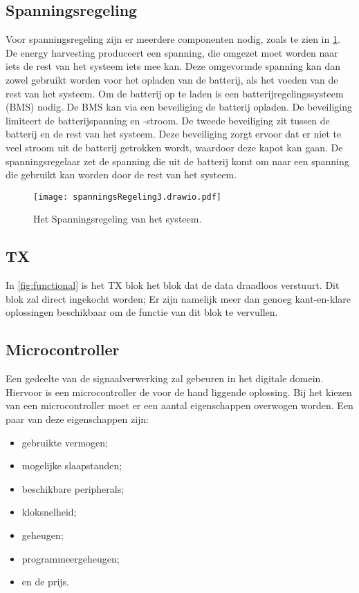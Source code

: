 \subsection{Spanningsregeling}
Voor spanningsregeling zijn er meerdere componenten nodig, zoals te zien in \cref{fig:spanningsregeling}. De energy harvesting produceert een spanning, die omgezet moet worden naar iets de rest van het systeem iets mee kan. Deze omgevormde spanning kan dan zowel gebruikt worden voor het opladen van de batterij, als het voeden van de rest van het systeem.
Om de batterij op te laden is een batterijregelingssysteem (BMS) nodig. De BMS kan via een beveiliging de batterij opladen. De beveiliging limiteert de batterijspanning en -stroom. De tweede beveiliging zit tussen de batterij en de rest van het systeem. Deze beveiliging zorgt ervoor dat er niet te veel stroom uit de batterij getrokken wordt, waardoor deze kapot kan gaan. De spanningsregelaar zet de spanning die uit de batterij komt om naar een spanning die gebruikt kan worden door de rest van het systeem.

\begin{figure}[!htbp]
    \centering
    \texttt{[image: spanningsRegeling3.drawio.pdf]}
    \caption{Het Spanningsregeling van het systeem.}
    \label{fig:spanningsregeling}
\end{figure}

\subsection{TX}
In \cref{fig:functional} is het TX blok het blok dat de data draadloos verstuurt. Dit blok zal direct ingekocht worden; Er zijn namelijk meer dan genoeg kant-en-klare oplossingen beschikbaar om de functie van dit blok te vervullen.


\subsection{Microcontroller}
Een gedeelte van de signaalverwerking zal gebeuren in het digitale domein. Hiervoor is een microcontroller de voor de hand liggende oplossing. Bij het kiezen van een microcontroller moet er een aantal eigenschappen overwogen worden. Een paar van deze eigenschappen zijn:
\begin{itemize}
    \item gebruikte vermogen;
    \item mogelijke slaapstanden;
    \item beschikbare peripherals;
    \item kloksnelheid;
    \item geheugen;
    \item programmeergeheugen;
    \item en de prijs.
\end{itemize}
